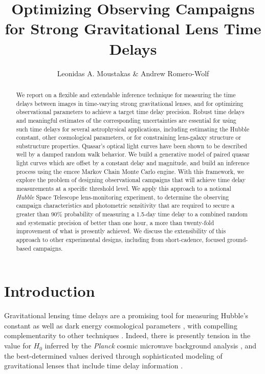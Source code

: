 \documentclass{emulateapj}
\begin{document}
\title{Optimizing Observing Campaigns for Strong  Gravitational Lens Time Delays} 
\author{Leonidas A. Moustakas \& Andrew Romero-Wolf} 

\begin{abstract}
  We report on a flexible and extendable inference technique for
  measuring the time delays between images in time-varying strong
  gravitational lenses, and for optimizing observational parameters to
  achieve a target time delay precision.  Robust time delays and
  meaningful estimates of the corresponding uncertainties are
  essential for using such time delays for several astrophysical
  applications, including estimating the Hubble constant, other
  cosmological parameters, or for constraining lens-galaxy structure
  or substructure properties. Quasar's optical light curves have been
  shown to be described well by a damped random walk behavior. We
  build a generative model of paired quasar light curves which are
  offset by a constant delay and magnitude, and build an inference
  process using the emcee Markov Chain Monte Carlo engine.  With this
  framework, we explore the problem of designing observational
  campaigns that will achieve time delay measurements at a specific
  threshold level.  We apply this approach to a notional \emph{Hubble}
  Space Telescope lens-monitoring experiment, to determine the
  observing campaign characteristics and photometric sensitivity that
  are required to secure a greater than 90\% probability of measuring
  a 1.5-day time delay to a combined random and systematic precision
  of better than one hour, a more than twenty-fold improvement of what
  is presently achieved.  We discuss the extensibility of this
  approach to other experimental designs, including from
  short-cadence, focused ground-based campaigns. 
\end{abstract}
 

\section{Introduction}

Gravitational lensing time delays are a promising tool for measuring
Hubble's constant \citep[$H_0$;][]{Refsdal1964a} as well as dark
energy cosmological parameters \citep{Coe2009b, Linder2011a,
  Treu2013a}, with compelling complementarity to other techniques
\citep{Weinberg2013a, Linder2015a}.  Indeed, there is presently
tension in the value for $H_0$ inferred by the \emph{Planck} cosmic
microwave background analysis \citep{Planck-Collaboration2014a,
  Planck-Collaboration2015a}, and the best-determined values derived
through sophisticated modeling of gravitational lenses that include
time delay information \citep[e.g.][]{Suyu2013a, Suyu2014a}.
\end{document}
